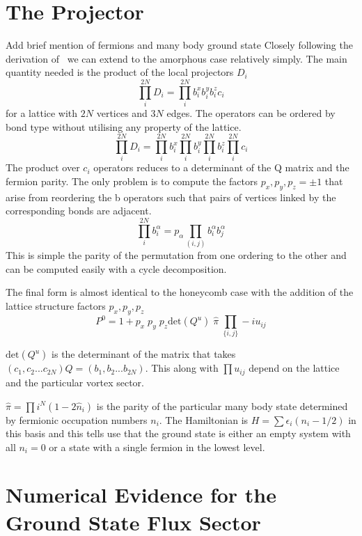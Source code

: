 \documentclass[%
 reprint,
superscriptaddress,
 amsmath,amssymb,
aps,
]{revtex4-2}
\begin{document}
\section{The Projector} \label{apx:projector}
{\color{red} Add brief mention of fermions and many body ground state}
Closely following the derivation of~\cite{pedrocchiPhysicalSolutionsKitaev2011} we can extend to the amorphous case relatively simply. The main quantity needed is the product of the local projectors \(D_i\)
\[\prod_i^{2N} D_i = \prod_i^{2N} b^x_i b^y_i b^z_i c_i \]
for a lattice with \(2N\) vertices and \(3N\) edges. The operators can be ordered by bond type without utilising any property of the lattice.
\[\prod_i^{2N} D_i = \prod_i^{2N} b^x_i \prod_i^{2N} b^y_i \prod_i^{2N} b^z_i \prod_i^{2N} c_i\]
The product over \(c_i\) operators reduces to a determinant of the Q matrix and the fermion parity. The only problem is to compute the factors \(p_x,p_y,p_z = \pm1\) that arise from reordering the b operators such that pairs of vertices linked by the corresponding bonds are adjacent.
\[\prod_i^{2N} b^\alpha_i = p_\alpha \prod_{(i,j)}b^\alpha_i b^\alpha_j\]
This is simple the parity of the permutation from one ordering to the other and can be computed easily with a cycle decomposition.

The final form is almost identical to the honeycomb case with the addition of the lattice structure factors \(p_x,p_y,p_z\)
\[P^0 = 1 + p_x\;p_y\;p_z \mathrm{det}(Q^u) \; \hat{\pi} \; \prod_{\{i,j\}} -iu_{ij}\] 

\(\mathrm{det}(Q^u)\) is the determinant of the matrix that takes \((c_1, c_2... c_{2N}) Q = (b_1, b_2... b_{2N})\). This along with \(\prod u_{ij}\) depend on the lattice and the particular vortex sector. 

\(\hat{\pi} = \prod{i}^{N} (1 - 2\hat{n}_i)\) is the parity of the particular many body state determined by fermionic occupation numbers \(n_i\). The Hamiltonian is \(H = \sum \epsilon_i (n_i - 1/2)\) in this basis and this tells use that the ground state is either an empty system with all \(n_i = 0\) or a state with a single fermion in the lowest level. 

\section{Numerical Evidence for the Ground State Flux Sector} \label{apx:ground_state}
\end{document}
